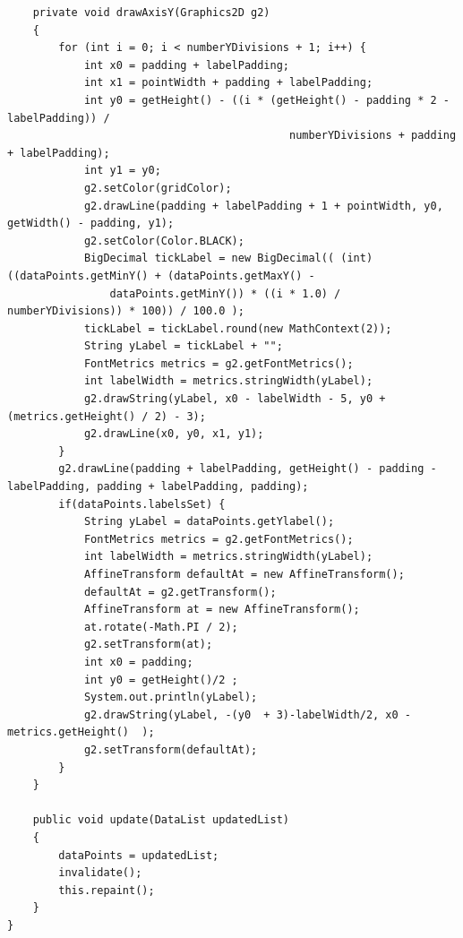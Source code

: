 \documentclass[11pt]{article} %
\begin{document}
\begin{lstlisting}
    private void drawAxisY(Graphics2D g2)
    {
        for (int i = 0; i < numberYDivisions + 1; i++) {
            int x0 = padding + labelPadding;
            int x1 = pointWidth + padding + labelPadding;
            int y0 = getHeight() - ((i * (getHeight() - padding * 2 - labelPadding)) /
                                            numberYDivisions + padding + labelPadding);
            int y1 = y0;
            g2.setColor(gridColor);
            g2.drawLine(padding + labelPadding + 1 + pointWidth, y0, getWidth() - padding, y1);
            g2.setColor(Color.BLACK);
            BigDecimal tickLabel = new BigDecimal(( (int)((dataPoints.getMinY() + (dataPoints.getMaxY() -
                dataPoints.getMinY()) * ((i * 1.0) / numberYDivisions)) * 100)) / 100.0 );
            tickLabel = tickLabel.round(new MathContext(2));
            String yLabel = tickLabel + "";
            FontMetrics metrics = g2.getFontMetrics();
            int labelWidth = metrics.stringWidth(yLabel);
            g2.drawString(yLabel, x0 - labelWidth - 5, y0 + (metrics.getHeight() / 2) - 3);
            g2.drawLine(x0, y0, x1, y1);
        }
        g2.drawLine(padding + labelPadding, getHeight() - padding - labelPadding, padding + labelPadding, padding);
        if(dataPoints.labelsSet) {
            String yLabel = dataPoints.getYlabel();
            FontMetrics metrics = g2.getFontMetrics();
            int labelWidth = metrics.stringWidth(yLabel);
            AffineTransform defaultAt = new AffineTransform();
            defaultAt = g2.getTransform();
            AffineTransform at = new AffineTransform();
            at.rotate(-Math.PI / 2);
            g2.setTransform(at);
            int x0 = padding;
            int y0 = getHeight()/2 ;
            System.out.println(yLabel);
            g2.drawString(yLabel, -(y0  + 3)-labelWidth/2, x0 - metrics.getHeight()  );
            g2.setTransform(defaultAt);
        }
    }
    
    public void update(DataList updatedList)
    {
        dataPoints = updatedList;
        invalidate();
        this.repaint();
    }
}
\end{lstlisting}
\end{document}
